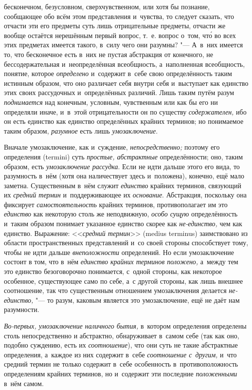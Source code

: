 бесконечном, безусловном, сверхчувственном, или хотя бы познание,
сообщающее обо всём этом представления и~чувства, то следует сказать, что
отчасти эти его предметы суть лишь отрицательные предметы, отчасти же
вообще остаётся нерешённым первый вопрос, т.~е. вопрос о~том, чт\'{о} во всех
этих предметах имеется такого, в~силу чего они разумны? "--- А~в~них имеется
то, что бесконечное есть в~них не пустая абстракция от конечного, не
бессодержательная и~неопределённая всеобщность, а~наполненная всеобщность,
понятие, которое {\em определено} и~содержит в~себе свою определённость таким
истинным образом, что оно различает себя внутри себя и~выступает как единство
этих своих рассудочных и~определённых различий. Лишь таким путём разум
{\em поднимается} над конечным, условным, чувственным или как бы его ни
определяли иначе, и~в~этой отрицательности он по существу {\em содержателен,}
ибо он есть единство как единство определённых крайних терминов; но понимаемое
таким образом, {\em разумное} есть лишь {\em умозаключение}.

Вначале умозаключение, как и~суждение, {\em непосредственно;} поэтому его
определения (termini) суть {\em простые, абстрактные} определённости;
оно, таким образом, есть {\em умозаключение рассудка}. Если не идти дальше
этого его вида, то разумность в~нём (хотя она наличествует здесь и~положена),
конечно, ещё мало заметна. Существенным в~нём служит {\em единство} крайних
терминов, связующий их {\em средний термин} и~поддерживающее их
{\em основание}. Абстракция, поскольку она фиксирует {\em самостоятельность}
крайних терминов, противополагает им это {\em единство} как некоторую столь же
неподвижную, {\em особо сущую} определённость и~таким образом понимает
указанное единство скорее как {\em не-единство,} чем как единство. Выражение:
<<{\em средний термин}>> (medius terminus) заимствовано из области
пространственных представлений и~со своей стороны способствует тому, чтобы не
идти дальше {\em внеположности} определений. Но если умозаключение состоит в
том, что в~нём {\em единство крайних терминов положено,} а~между тем это
единство безоговорочно понимается, с~одной стороны, как некоторое особенное,
существующее само по себе, а~с другой стороны, как лишь внешнее соотношение,
так что существенным отношением умозаключения делается {\em не-единство,} "---
то разум, каковым является это умозаключение, ещё не даёт нам разумности.

{\em Во-первых, умозаключение наличного бытия,}
в~котором определения определены столь непосредственно и
абстрактно, обнаруживает в~самом себе (так как оно, подобно суждению, есть
их {\em соотношение}), что они суть не такие абстрактные определения, а~каждое
из них содержит в~себе {\em соотношение с~другим,} и~что средний термин не
только содержит в~себе особенность в~противоположность определениям крайних
терминов, но и~содержит эти последние {\em положенными} в~нём самом.

